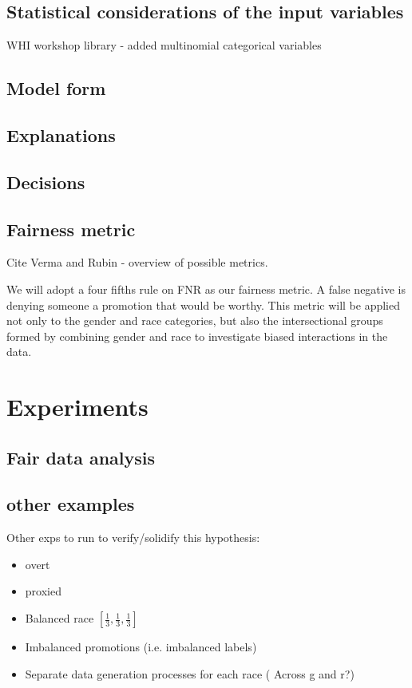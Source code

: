 \documentclass[manuscript,screen,review]{acmart}
\begin{document}
\subsection{Statistical considerations of the input variables}
WHI workshop library - added multinomial categorical variables



\subsection{Model form}


\subsection{Explanations}

\subsection{Decisions}

\subsection{Fairness metric}
Cite Verma and Rubin - overview of possible metrics.

We will adopt a four fifths rule on FNR as our fairness metric.  A false negative is denying someone a promotion that would be worthy.  This metric will be applied not only to the gender and race categories, but also the intersectional groups formed by combining gender and race to investigate biased interactions in the data.

\section{Experiments}

\subsection{Fair data analysis}

\subsection{other examples}
Other exps to run to verify/solidify this hypothesis:

\begin{itemize}
    \item overt
    \item proxied
    \item Balanced race $[\frac{1}{3}, \frac{1}{3}, \frac{1}{3}] $
    \item Imbalanced promotions (i.e. imbalanced labels)
    \item Separate data generation processes for each race ( Across g and r?)
\end{itemize}
\end{document}
